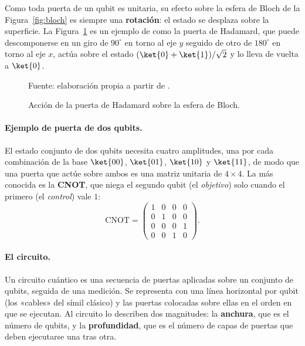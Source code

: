Como toda puerta de un qubit es unitaria, su efecto sobre la esfera de Bloch de la
Figura~\ref{fig:bloch} es siempre una \textbf{rotación}: el estado se desplaza sobre la
superficie. La Figura~\ref{fig:hadamard} es un ejemplo de como la puerta de
Hadamard, que puede descomponerse en un giro de $90^\circ$ en torno al eje $y$ seguido de
otro de $180^\circ$ en torno al eje $x$, actúa sobre el estado
$(\ket{0}+\ket{1})/\sqrt{2}$ y lo lleva de vuelta a $\ket{0}$.

\begin{figure}[htbp]
    \centering
    

    \caption{Acción de la puerta de Hadamard sobre la esfera de Bloch.}
    \label{fig:hadamard}

    {\footnotesize Fuente: elaboración propia a partir de .}
\end{figure}

\paragraph{Ejemplo de puerta de dos qubits.} El estado conjunto de dos qubits necesita cuatro
amplitudes, una por cada combinación de la base $\ket{00}$, $\ket{01}$, $\ket{10}$ y
$\ket{11}$, de modo que una puerta que actúe sobre ambos es una matriz unitaria de
$4\times 4$. La más conocida es la \textbf{CNOT}, que niega el segundo qubit (el
\textit{objetivo}) solo cuando el primero (el \textit{control}) vale $1$:
\begin{equation}
\label{eq:cnot}
\mathrm{CNOT} =
\begin{pmatrix}
1 & 0 & 0 & 0 \\
0 & 1 & 0 & 0 \\
0 & 0 & 0 & 1 \\
0 & 0 & 1 & 0
\end{pmatrix}.
\end{equation}

\paragraph{El circuito.} Un circuito cuántico es una secuencia de puertas aplicadas sobre
un conjunto de qubits, seguida de una medición. Se representa con una línea horizontal por
qubit (los «cables» del símil clásico) y las puertas colocadas sobre ellas en el orden en
que se ejecutan. Al circuito lo describen dos magnitudes: la \textbf{anchura},
que es el número de qubits, y la \textbf{profundidad}, que es el número de capas de puertas
que deben ejecutarse una tras otra.

